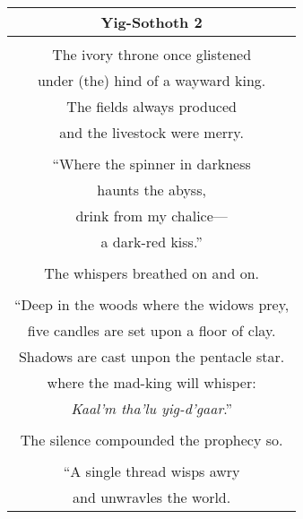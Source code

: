 \documentclass{article}
\begin{document}
\begin{center}
\begin{tabular}{c}
\textbf{Yig-Sothoth 2} \\ \hline
\\
The ivory throne once glistened \\
under (the) hind of a wayward king. \\
The fields always produced \\
and the livestock were merry. \\
\\
``Where the spinner in darkness \\
haunts the abyss, \\
drink from my chalice--- \\
a dark-red kiss.'' \\
\\
The whispers breathed on and on. \\
\\
``Deep in the woods where the widows prey, \\
five candles are set upon a floor of clay. \\
Shadows are cast unpon the pentacle star. \\
where the mad-king will whisper: \\
\textit{Kaal'm tha'lu yig-d'gaar}.'' \\
\\
The silence compounded the prophecy so. \\
\\
``A single thread wisps awry \\
and unwravles the world. \\


\end{tabular}
\end{center}
\end{document}
